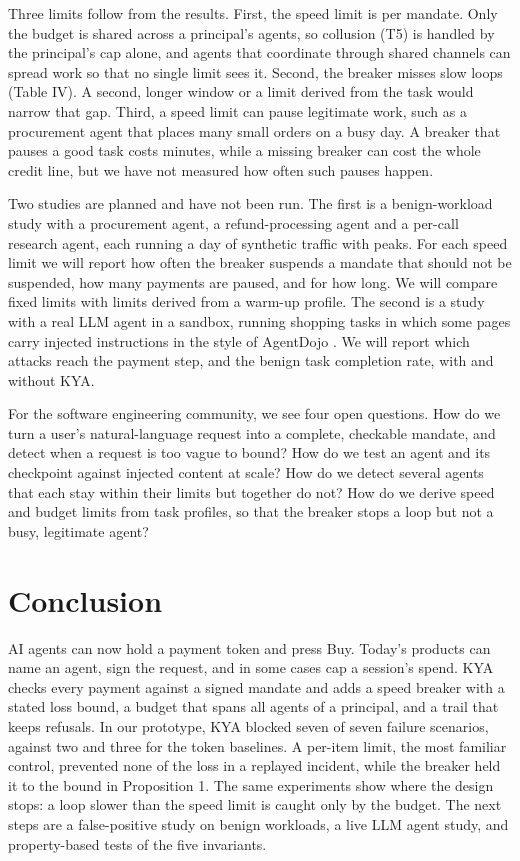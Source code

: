\documentclass[conference]{IEEEtran}
\begin{document}
Three limits follow from the results. First, the speed limit is per mandate. Only the budget is shared across a principal's agents, so collusion (T5) is handled by the principal's cap alone, and agents that coordinate through shared channels can spread work so that no single limit sees it. Second, the breaker misses slow loops (Table IV). A second, longer window or a limit derived from the task would narrow that gap. Third, a speed limit can pause legitimate work, such as a procurement agent that places many small orders on a busy day. A breaker that pauses a good task costs minutes, while a missing breaker can cost the whole credit line, but we have not measured how often such pauses happen.

Two studies are planned and have not been run. The first is a benign-workload study with a procurement agent, a refund-processing agent and a per-call research agent, each running a day of synthetic traffic with peaks. For each speed limit we will report how often the breaker suspends a mandate that should not be suspended, how many payments are paused, and for how long. We will compare fixed limits with limits derived from a warm-up profile. The second is a study with a real LLM agent in a sandbox, running shopping tasks in which some pages carry injected instructions in the style of AgentDojo \cite{b26}. We will report which attacks reach the payment step, and the benign task completion rate, with and without KYA.

For the software engineering community, we see four open questions. How do we turn a user's natural-language request into a complete, checkable mandate, and detect when a request is too vague to bound? How do we test an agent and its checkpoint against injected content at scale? How do we detect several agents that each stay within their limits but together do not? How do we derive speed and budget limits from task profiles, so that the breaker stops a loop but not a busy, legitimate agent?

\section{Conclusion}

AI agents can now hold a payment token and press Buy. Today's products can name an agent, sign the request, and in some cases cap a session's spend. KYA checks every payment against a signed mandate and adds a speed breaker with a stated loss bound, a budget that spans all agents of a principal, and a trail that keeps refusals. In our prototype, KYA blocked seven of seven failure scenarios, against two and three for the token baselines. A per-item limit, the most familiar control, prevented none of the loss in a replayed incident, while the breaker held it to the bound in Proposition 1. The same experiments show where the design stops: a loop slower than the speed limit is caught only by the budget. The next steps are a false-positive study on benign workloads, a live LLM agent study, and property-based tests of the five invariants.
\end{document}
